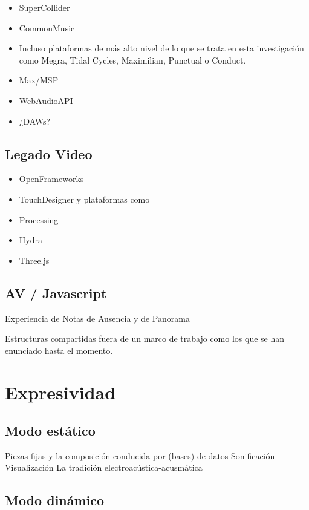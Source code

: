 \documentclass[12pt,a4paper, openright,
headinclude,footinclude,BCOR5mm,
numbers=noenddot,cleardoublepage=empty,
tablecaptionabove]{article}
\begin{document}
\begin{itemize}
\item SuperCollider
\item CommonMusic 
\item Incluso plataformas de más alto nivel de lo que se trata en esta investigación como Megra, Tidal Cycles, Maximilian, Punctual o Conduct.
\item Max/MSP
\item WebAudioAPI
\item ¿DAWs? 
\end{itemize}

\subsection{Legado Video}

\begin{itemize}
\item OpenFrameworks 
\item TouchDesigner y plataformas como 
\item Processing
\item Hydra
\item Three.js 
\end{itemize}

\subsection{AV / Javascript}

Experiencia de Notas de Ausencia y de Panorama 

Estructuras compartidas fuera de un marco de trabajo como los que se han enunciado hasta el momento.

\section{Expresividad}

\subsection{Modo estático}

Piezas fijas y la composición conducida por (bases) de datos 
Sonificación-Visualización
La tradición electroacústica-acusmática 

\subsection{Modo dinámico}
\end{document}
